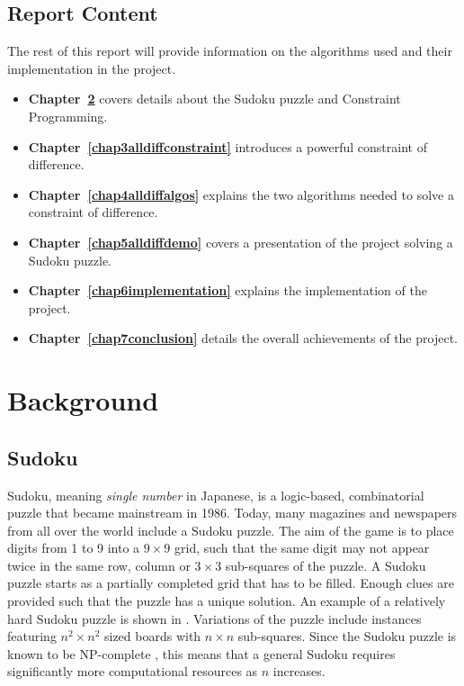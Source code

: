 \documentclass{l4proj}
\begin{document}
\section{Report Content}
The rest of this report will provide information on the algorithms used and their implementation in the project.
\begin{itemize}
\item \textbf{Chapter~\ref{chap2background}} covers details about the Sudoku puzzle and Constraint Programming.
\item \textbf{Chapter~\ref{chap3alldiffconstraint}} introduces a powerful constraint of difference.
\item \textbf{Chapter~\ref{chap4alldiffalgos}} explains the two algorithms needed to solve a constraint of difference.
\item \textbf{Chapter~\ref{chap5alldiffdemo}} covers a presentation of the project solving a Sudoku puzzle.
\item \textbf{Chapter~\ref{chap6implementation}} explains the implementation of the project.
\item \textbf{Chapter~\ref{chap7conclusion}} details the overall achievements of the project.
\end{itemize}

\chapter{Background}
\label{chap2background}
\section{Sudoku}
\noindent Sudoku, meaning \textit{single number} in Japanese, is a logic-based, combinatorial puzzle that became mainstream in 1986. Today, many magazines and newspapers from all over the world include a Sudoku puzzle. The aim of the game is to place digits from 1 to 9 into a $9 \times 9$ grid, such that the same digit may not appear twice in the same row, column or $3\times 3$ sub-squares of the puzzle. A Sudoku puzzle starts as a partially completed grid that has to be filled. Enough clues are provided such that the puzzle has a unique solution. An example of a relatively hard Sudoku puzzle is shown in . Variations of the puzzle include instances featuring $n^2\times n^2$ sized boards with $n\times n$ sub-squares. Since the Sudoku puzzle is known to be NP-complete \cite{colbourn1984complexity}, this means that a general Sudoku requires significantly more computational resources as $n$ increases.
\end{document}
